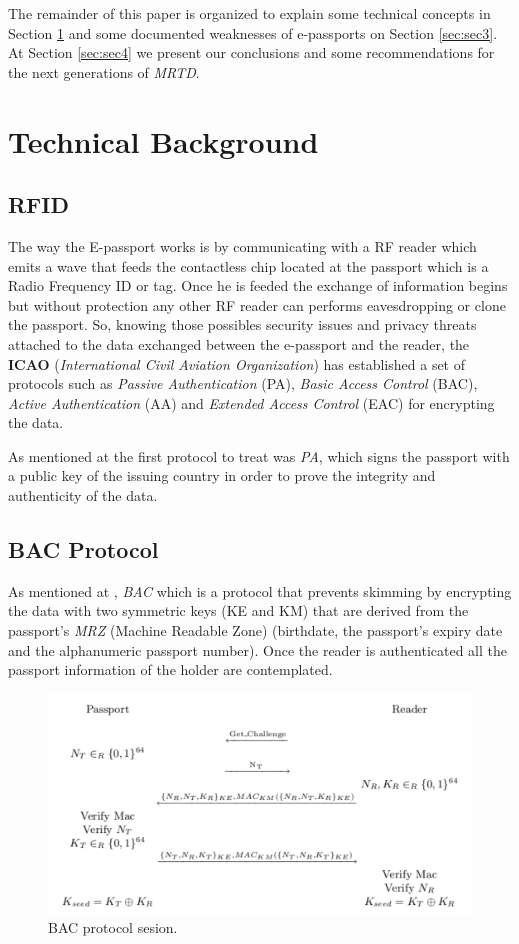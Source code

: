 \documentclass{acm_proc_article-sp}
\begin{document}
The remainder of this paper is organized to explain some technical concepts in Section \ref{sec:sec2} and some documented weaknesses of e-passports on Section \ref{sec:sec3}. At Section \ref{sec:sec4} we present our conclusions and some recommendations for the next generations of \emph{MRTD}. 

\section{Technical Background}
\label{sec:sec2}

\subsection{RFID}
The way the E-passport works is by communicating with a RF reader which emits a wave that feeds 
the contactless chip located at the passport which is a Radio Frequency ID or tag. Once he is feeded the exchange of information begins but 
without protection any other RF reader can performs eavesdropping or clone the passport. So, knowing those possibles security issues and privacy threats attached to
the data exchanged between the e-passport and the reader, the \textbf{ICAO} 
(\textit{International Civil Aviation Organization}) has 
established a set of protocols such as \textit{Passive Authentication} (PA), \textit{Basic Access Control} (BAC), 
\textit{Active Authentication} (AA) and \textit{Extended Access Control} (EAC) for encrypting the data.

As mentioned at \cite{NM12} the first protocol to treat was \textit{PA}, which signs the passport with 
a public key of the issuing country in order to prove the integrity and authenticity of the data.

\subsection{BAC Protocol}
As mentioned at \cite{CLPS07}, \textit{BAC} which is a protocol that prevents skimming by encrypting 
the data with two symmetric keys (KE and KM) that are derived from the passport's  
\textit{MRZ} (Machine Readable Zone) (birthdate, the passport’s expiry date and the alphanumeric 
passport number). Once the reader is authenticated all the passport information of the holder are contemplated.

\begin{figure}
  \centering
  \includegraphics[scale=0.35]{BAC.pdf}
  \caption{BAC protocol sesion.}
  \label{fig:fig1}
\end{figure}
\end{document}
